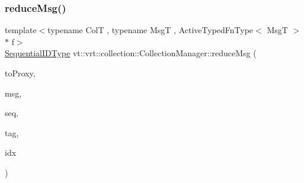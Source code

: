 \subsubsection{\texorpdfstring{reduce\+Msg()}{reduceMsg()}\hspace{0.1cm}{\footnotesize\ttfamily [2/2]}}
{\footnotesize\ttfamily template$<$typename ColT , typename MsgT , Active\+Typed\+Fn\+Type$<$ Msg\+T $>$ $\ast$ f$>$ \\
\hyperlink{namespacevt_a3063d4db3b879d6dd2c7b8d50995c7f6}{Sequential\+I\+D\+Type} vt\+::vrt\+::collection\+::\+Collection\+Manager\+::reduce\+Msg (\begin{DoxyParamCaption}\item[{\hyperlink{structvt_1_1vrt_1_1collection_1_1_collection_manager_a56458ed7f9bb22b631b9b3a745f42f94}{Collection\+Proxy\+Wrap\+Type}$<$ ColT, typename Col\+T\+::\+Index\+Type $>$ const \&}]{to\+Proxy,  }\item[{MsgT $\ast$const}]{msg,  }\item[{\hyperlink{namespacevt_a3063d4db3b879d6dd2c7b8d50995c7f6}{Sequential\+I\+D\+Type}}]{seq,  }\item[{\hyperlink{namespacevt_a84ab281dae04a52a4b243d6bf62d0e52}{Tag\+Type}}]{tag,  }\item[{typename Col\+T\+::\+Index\+Type const \&}]{idx }\end{DoxyParamCaption})}

\mbox{\label{structvt_1_1vrt_1_1collection_1_1_collection_manager_a24e88e79e220be4b8933342576246630}} 
